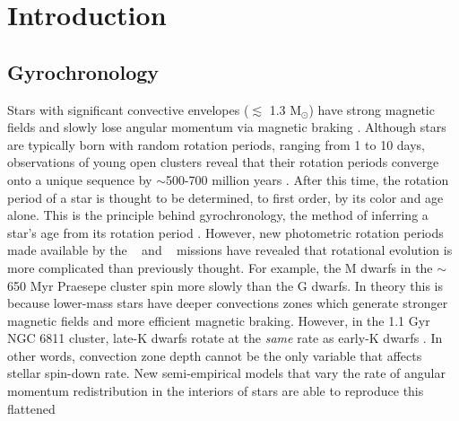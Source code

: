 \section{Introduction}

\subsection{Gyrochronology}

Stars with significant convective envelopes ($\lesssim$ 1.3 M$_\odot$) have
strong magnetic fields and slowly lose angular momentum via magnetic braking
\citep[\eg][]{schatzman1962, weber1967, skumanich1972, kawaler1988,
pinsonneault1989}.
Although stars are typically born with random rotation periods, ranging from 1
to 10 days, observations of young open clusters reveal that their rotation
periods converge onto a unique sequence by $\sim$500-700 million years
\citep[\eg][]{irwin2009, gallet2013}.
After this time, the rotation period of a star is thought to be determined, to
first order, by its color and age alone.
This is the principle behind gyrochronology, the method of inferring a
star’s age from its rotation period \citep[\eg][]{barnes2003, barnes2007,
barnes2010, meibom2011, meibom2015}.
However, new photometric rotation periods made available by the \kepler\
\citep{borucki2010} and \ktwo\ \citep{howell2014} missions
\citep[\eg][]{mcquillan2014, garcia2014, douglas2017, rebull2017, meibom2011,
meibom2015, curtis2019} have revealed that rotational evolution is more
complicated than previously thought.
For example, the M dwarfs in the $\sim$ 650 Myr Praesepe cluster spin more
slowly than the G dwarfs.
In theory this is because lower-mass stars have deeper convections zones which
generate stronger magnetic fields and more efficient magnetic braking.
However, in the 1.1 Gyr NGC 6811 cluster, late-K dwarfs rotate at the {\it
same} rate as early-K dwarfs \citep{curtis2019}.
In other words, convection zone depth cannot be the only variable that affects
stellar spin-down rate.
New semi-empirical models that vary the rate of angular momentum
redistribution in the interiors of stars are able to reproduce this flattened
